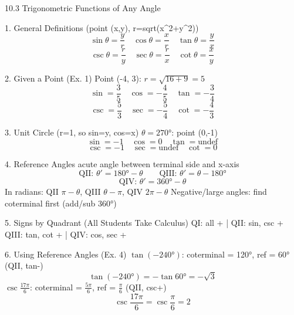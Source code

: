 10.3 Trigonometric Functions of Any Angle

1. General Definitions (point (x,y), r=sqrt(x^2+y^2))
$$ \sin\theta=\frac{y}{r} \quad \cos\theta=\frac{x}{r} \quad \tan\theta=\frac{y}{x} $$
$$ \csc\theta=\frac{r}{y} \quad \sec\theta=\frac{r}{x} \quad \cot\theta=\frac{x}{y} $$

2. Given a Point (Ex. 1)
Point (-4, 3): $r = \sqrt{16+9} = 5$
$$ \sin=\frac{3}{5} \quad \cos=-\frac{4}{5} \quad \tan=-\frac{3}{4} $$
$$ \csc=\frac{5}{3} \quad \sec=-\frac{5}{4} \quad \cot=-\frac{4}{3} $$

3. Unit Circle (r=1, so sin=y, cos=x)
$\theta=270°$: point (0,-1)
$$ \sin=-1 \quad \cos=0 \quad \tan=\text{undef} $$
$$ \csc=-1 \quad \sec=\text{undef} \quad \cot=0 $$

4. Reference Angles
acute angle between terminal side and x-axis
$$ \text{QII: } \theta'=180°-\theta \qquad \text{QIII: } \theta'=\theta-180° $$
$$ \text{QIV: } \theta'=360°-\theta $$
In radians: QII $\pi-\theta$, QIII $\theta-\pi$, QIV $2\pi-\theta$
Negative/large angles: find coterminal first (add/sub 360°)

5. Signs by Quadrant (All Students Take Calculus)
QI: all + | QII: sin, csc +
QIII: tan, cot + | QIV: cos, sec +

6. Using Reference Angles (Ex. 4)
$\tan(-240°)$: coterminal = 120°, ref = 60° (QII, tan-)
$$ \tan(-240°) = -\tan 60° = -\sqrt{3} $$
$\csc\frac{17\pi}{6}$: coterminal = $\frac{5\pi}{6}$, ref = $\frac{\pi}{6}$ (QII, csc+)
$$ \csc\frac{17\pi}{6} = \csc\frac{\pi}{6} = 2 $$
